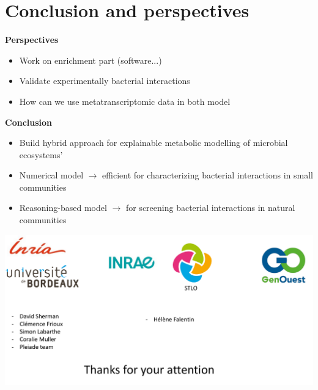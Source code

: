 \documentclass[8pt,usenames,dvipsnames]{beamer}
\begin{document}
\section{Conclusion and perspectives}
\begin{frame}


\begin{centering}
\textbf{Perspectives}
\begin{itemize}
\item Work on enrichment part (software...)
\item Validate experimentally bacterial interactions 
\item How can we use metatranscriptomic data in both model 
\end{itemize}
\vspace{1cm}
\textbf{Conclusion}
\begin{itemize}
\item Build hybrid approach for explainable metabolic modelling of microbial ecosystems'
\item Numerical model $\rightarrow$ efficient for characterizing bacterial interactions in small communities
\item Reasoning-based model $\rightarrow$ for screening bacterial interactions in natural communities
\end{itemize}
\end{centering}
\end{frame}

\begin{frame}
\includegraphics[width=\textwidth]{figures/merci.pdf}
\end{frame}
\end{document}
